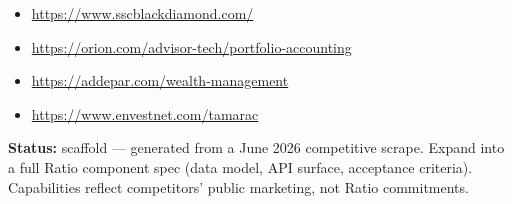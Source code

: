 \footnotesize
\begin{itemize}
  \item \url{https://www.sscblackdiamond.com/}
  \item \url{https://orion.com/advisor-tech/portfolio-accounting}
  \item \url{https://addepar.com/wealth-management}
  \item \url{https://www.envestnet.com/tamarac}
\end{itemize}

\begin{statusbox}
\textbf{Status:} scaffold --- generated from a June 2026 competitive scrape.
Expand into a full Ratio component spec (data model, API surface, acceptance
criteria). Capabilities reflect competitors' public marketing, not Ratio commitments.
\end{statusbox}


